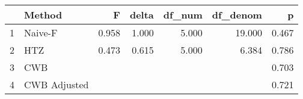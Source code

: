 \begin{table}[ht]
\centering
\begin{tabular}{rlrrrrr}
  \hline
 & Method & F & delta & df\_num & df\_denom & p \\ 
  \hline
1 & Naive-F & 0.958 & 1.000 & 5.000 & 19.000 & 0.467 \\ 
  2 & HTZ & 0.473 & 0.615 & 5.000 & 6.384 & 0.786 \\ 
  3 & CWB &  &  &  &  & 0.703 \\ 
  4 & CWB Adjusted &  &  &  &  & 0.721 \\ 
   \hline
\end{tabular}
\end{table}
